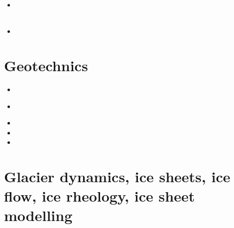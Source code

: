 \begin{small}
\begin{itemize}
 \\
 \\
 \\
 \\
 \\
 \\
 \\
\item[\twothousandtwentythree]  
 \\
 \\
\item[\twothousandtwentyfour]  
 \\
\end{itemize}
\end{small}

\section{Geotechnics}

\begin{small}
\begin{itemize}
\item[\nineteenninetynine] 
\item[\twothousandthree] 
 \\
\item[\twothousandfour] 
\item[\twothousandsix] 
\item[\twothousandfourteen] 
\end{itemize}
\end{small}

\section{Glacier dynamics, ice sheets, ice flow, ice rheology, ice sheet modelling}

